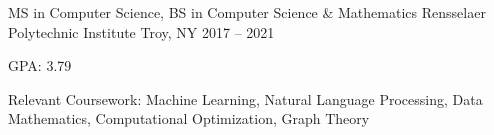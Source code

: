 


\begin{cventries}

  \cventry
  {MS in Computer Science, BS in Computer Science \& Mathematics}
	{Rensselaer Polytechnic Institute}
	{Troy, NY}
	{2017 – 2021}
  {
    \begin{cvitems}
      \item GPA: 3.79
      \item Relevant Coursework: Machine Learning, Natural Language Processing, Data Mathematics, Computational Optimization, Graph Theory
    \end{cvitems}
  }


\end{cventries}